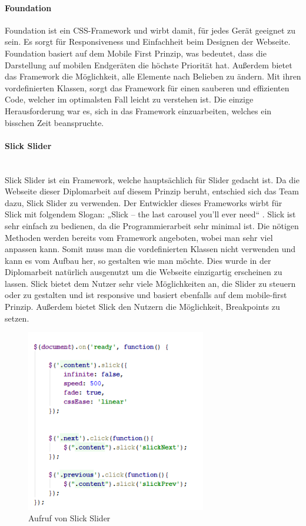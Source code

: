 \paragraph{Foundation}
Foundation ist ein CSS-Framework und wirbt damit, für jedes Gerät geeignet zu sein. Es sorgt für Responsiveness und Einfachheit beim Designen der Webseite. Foundation basiert auf dem Mobile First Prinzip, was bedeutet, dass die Darstellung auf mobilen Endgeräten die höchste Priorität hat.   Außerdem bietet das Framework die Möglichkeit, alle Elemente nach Belieben zu ändern. Mit ihren vordefinierten Klassen, sorgt das Framework für einen sauberen und effizienten Code, welcher im optimalsten Fall leicht zu verstehen ist. Die einzige Herausforderung war es, sich in das Framework einzuarbeiten, welches ein bisschen Zeit beanspruchte. 

\paragraph{Slick Slider}\\
Slick Slider ist ein Framework, welche hauptsächlich für Slider gedacht ist. Da die Webseite dieser Diplomarbeit auf diesem Prinzip beruht, entschied sich das Team dazu, Slick Slider zu verwenden. Der Entwickler dieses Frameworks wirbt für Slick mit folgendem Slogan: „Slick – the last carousel you’ll ever need“ . Slick ist sehr einfach zu bedienen, da die Programmierarbeit sehr minimal ist. Die nötigen Methoden werden bereits vom Framework angeboten, wobei man sehr viel anpassen kann. Somit muss man die vordefinierten Klassen nicht verwenden und kann es vom Aufbau her, so gestalten wie man möchte. Dies wurde in der Diplomarbeit natürlich ausgenutzt um die Webseite einzigartig erscheinen zu lassen. Slick bietet dem Nutzer sehr viele Möglichkeiten an, die Slider zu steuern oder zu gestalten und ist responsive und basiert ebenfalls auf dem mobile-first Prinzip. Außerdem bietet Slick den Nutzern die Möglichkeit, Breakpoints zu setzen.

\begin{figure}[H] 
  \centering
     \includegraphics[width=0.7\textwidth]{webseite_abb1.png}
  \caption{Aufruf von Slick Slider}

\end{figure}

